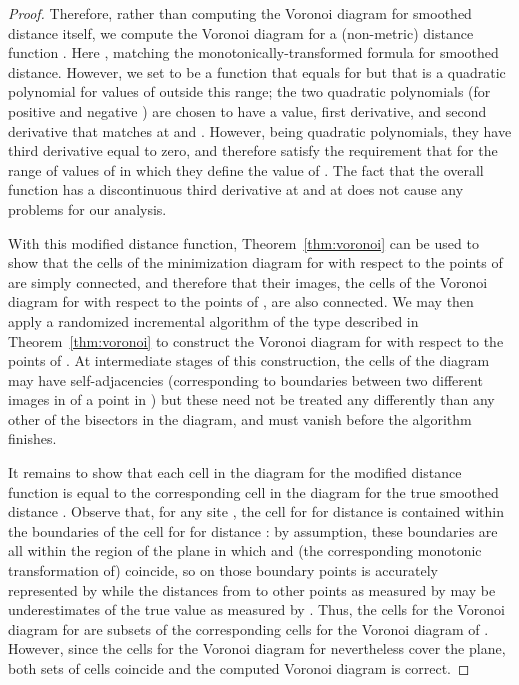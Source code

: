 \documentclass[10pt, conference, compsocconf]{IEEEtran}
\begin{document}
\begin{proof}
Therefore, rather than computing the Voronoi diagram for smoothed distance  itself, we compute
the Voronoi diagram for a (non-metric) distance function .
Here , matching the monotonically-transformed formula for smoothed distance. However, we set  to be a function that equals  for  but that is a quadratic polynomial for values of  outside this range; the two quadratic polynomials (for positive and negative ) are chosen to have a value, first derivative, and second derivative that matches  at  and . However, being quadratic polynomials, they have third derivative equal to zero, and therefore satisfy the requirement that  for the range of values of  in which they define the value of . The fact that the overall  function has a discontinuous third derivative at  and at  does not cause any problems for our analysis.

With this modified distance function, Theorem~\ref{thm:voronoi} can be used to show that the cells of the minimization diagram for  with respect to the points of  are simply connected, and therefore that their images, the cells of the Voronoi diagram for  with respect to the points of , are also connected. We may then apply a randomized incremental algorithm of the type described in Theorem~\ref{thm:voronoi} to construct the Voronoi diagram for  with respect to the points of . At intermediate stages of this construction, the cells of the diagram may have self-adjacencies (corresponding to boundaries between two different images in  of a point in ) but these need not be treated any differently than any other of the bisectors in the diagram, and must vanish before the algorithm finishes.

It remains to show that each cell in the diagram for the modified distance function is equal to the corresponding cell in the diagram for the true smoothed distance . Observe that, for any site , the cell for  for distance  is contained within the boundaries of the cell for  for distance : by assumption, these boundaries are all within the region of the plane in which  and (the corresponding monotonic transformation of)  coincide, so on those boundary points  is accurately represented by  while the distances from  to other points as measured by  may be underestimates of the true value as measured by . Thus, the cells for the Voronoi diagram for  are subsets of the corresponding cells for the Voronoi diagram of . However, since the cells for the Voronoi diagram for  nevertheless cover the plane, both sets of cells coincide and the computed Voronoi diagram is correct.
\end{proof}
\end{document}
